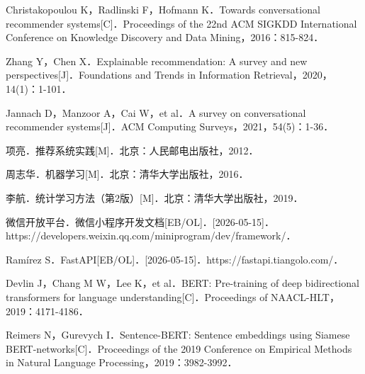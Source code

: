 \begin{flushleft}
\begin{enumerate}[label={[\arabic*]}, leftmargin=2em, itemsep=0.3em]
    \item Christakopoulou K，Radlinski F，Hofmann K．Towards conversational recommender systems[C]．Proceedings of the 22nd ACM SIGKDD International Conference on Knowledge Discovery and Data Mining，2016：815-824．
    \item Zhang Y，Chen X．Explainable recommendation: A survey and new perspectives[J]．Foundations and Trends in Information Retrieval，2020，14(1)：1-101．
    \item Jannach D，Manzoor A，Cai W，et al．A survey on conversational recommender systems[J]．ACM Computing Surveys，2021，54(5)：1-36．
    \item 项亮．推荐系统实践[M]．北京：人民邮电出版社，2012．
    \item 周志华．机器学习[M]．北京：清华大学出版社，2016．
    \item 李航．统计学习方法（第2版）[M]．北京：清华大学出版社，2019．
    \item 微信开放平台．微信小程序开发文档[EB/OL]．[2026-05-15]．https://developers.weixin.qq.com/miniprogram/dev/framework/．
    \item Ram{\'i}rez S．FastAPI[EB/OL]．[2026-05-15]．https://fastapi.tiangolo.com/．
    \item Devlin J，Chang M W，Lee K，et al．BERT: Pre-training of deep bidirectional transformers for language understanding[C]．Proceedings of NAACL-HLT，2019：4171-4186．
    \item Reimers N，Gurevych I．Sentence-BERT: Sentence embeddings using Siamese BERT-networks[C]．Proceedings of the 2019 Conference on Empirical Methods in Natural Language Processing，2019：3982-3992．
\end{enumerate}
\end{flushleft}
